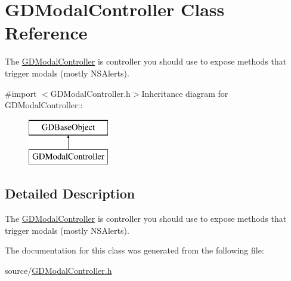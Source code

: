 \hypertarget{interface_g_d_modal_controller}{
\section{GDModalController Class Reference}
\label{interface_g_d_modal_controller}
}


The \hyperlink{interface_g_d_modal_controller}{GDModalController} is controller you should use to expose methods that trigger modals (mostly NSAlerts).  


{\ttfamily \#import $<$GDModalController.h$>$}Inheritance diagram for GDModalController::\begin{figure}[H]
\begin{center}
\leavevmode
\includegraphics[height=2cm]{interface_g_d_modal_controller}
\end{center}
\end{figure}


\subsection{Detailed Description}
The \hyperlink{interface_g_d_modal_controller}{GDModalController} is controller you should use to expose methods that trigger modals (mostly NSAlerts). 

The documentation for this class was generated from the following file:\begin{DoxyCompactItemize}
\item 
source/\hyperlink{_g_d_modal_controller_8h}{GDModalController.h}\end{DoxyCompactItemize}
